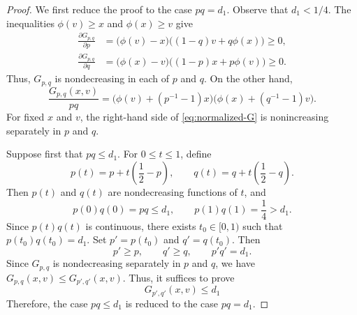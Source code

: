 \documentclass[11pt]{article}
\numberwithin{equation}{section}
\theoremstyle{definition}
\theoremstyle{remark}
\begin{document}
\begin{proof}
We first reduce the proof to the case $pq=d_1$. Observe that $d_1<1/4$. The inequalities
$\phi(v)\geq x$ and $\phi(x)\geq v$ give
\begin{align*}
 \frac{\partial G_{p,q}}{\partial p}
 &=
 \bigl(\phi(v)-x\bigr)
 \bigl((1-q)v+q\phi(x)\bigr)
 \geq0,\\
 \frac{\partial G_{p,q}}{\partial q}
 &=
 \bigl(\phi(x)-v\bigr)
 \bigl((1-p)x+p\phi(v)\bigr)
 \geq0.
\end{align*}
Thus, $G_{p,q}$ is nondecreasing in each of $p$ and $q$. On the other
hand,
\begin{equation}
 \frac{G_{p,q}(x,v)}{pq}
 =
 \bigl(\phi(v)+(p^{-1}-1)x\bigr)
 \bigl(\phi(x)+(q^{-1}-1)v\bigr).\label{eq:normalized-G}
\end{equation}
For fixed $x$ and $v$, the right-hand side of
\eqref{eq:normalized-G} is nonincreasing separately in $p$ and $q$.




Suppose first that $pq\leq d_1$. For $0\leq t\leq1$, define
\begin{equation*}
 p(t)=p+t\left(\frac12-p\right),
 \qquad
 q(t)=q+t\left(\frac12-q\right).
\end{equation*}
Then $p(t)$ and $q(t)$ are nondecreasing functions of $t$, and
\begin{equation*}
 p(0)q(0)=pq\leq d_1,
 \qquad
 p(1)q(1)=\frac14>d_1.
\end{equation*}
Since $p(t)q(t)$ is continuous, there exists $t_0\in[0,1)$ such that
$
 p(t_0)q(t_0)=d_1.
$
Set
$
 p'=p(t_0)
$
and 
$
 q'=q(t_0).
$
Then
\begin{equation*}
 p'\geq p,
 \qquad
 q'\geq q,
 \qquad
 p'q'=d_1.
\end{equation*}
Since $G_{p,q}$ is nondecreasing separately in $p$ and $q$, we
have
$
 G_{p,q}(x,v)
 \leq
 G_{p',q'}(x,v).
$
Thus, it suffices to prove
\begin{equation*}
 G_{p',q'}(x,v)\leq d_1
\end{equation*}
Therefore, the case $pq\leq d_1$ is reduced to the case $pq=d_1$.



\end{proof}
\end{document}
